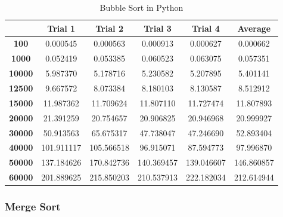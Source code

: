 \documentclass[]{report}
\begin{document}
		 		\begin{table}[H]  
  				  \centering
  				  \caption{Bubble Sort in Python}
		 		  \begin{tabular}{cccccc}
		 		    \toprule
		 		         & \textbf{Trial 1} & \textbf{Trial 2} & \textbf{Trial 3} & \textbf{Trial 4} & \textbf{Average} \\ \midrule
		 		    \textbf{100}   & 0.000545 & 0.000563 & 0.000913 & 0.000627 & 0.000662   \\
		 		    \textbf{1000}  & 0.052419 & 0.053385 & 0.060523 & 0.063075 & 0.057351   \\
		 		    \textbf{10000} & 5.987370 & 5.178716 & 5.230582 & 5.207895 & 5.401141   \\
		 		    \textbf{12500} & 9.667572 & 8.073384 & 8.180103 & 8.130587 & 8.512912   \\
		 		    \textbf{15000} & 11.987362 & 11.709624 & 11.807110 & 11.727474 & 11.807893   \\
		 		    \textbf{20000} & 21.391259 & 20.754657 & 20.906825 & 20.946968 & 20.999927   \\
		 		    \textbf{30000} & 50.913563 & 65.675317 & 47.738047 & 47.246690 & 52.893404   \\
		 		    \textbf{40000} & 101.911117 & 105.566518 & 96.915071 & 87.594773 & 97.996870   \\
		 		    \textbf{50000} & 137.184626 & 170.842736 & 140.369457 & 139.046607 & 146.860857   \\
		 		    \textbf{60000} & 201.889625 & 215.850203 & 210.537913 & 222.182034 & 212.614944   \\ \bottomrule
		 		  \end{tabular}
		 		\end{table}
		 		
		 		\subsubsection{Merge Sort} 	
		 		
\end{document}
